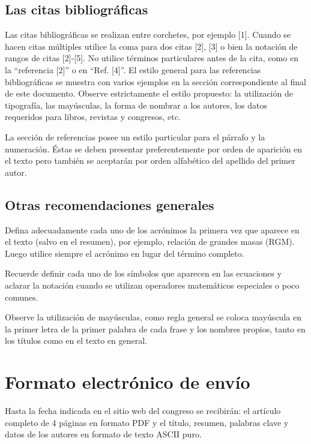 \documentclass[conference,a4paper,10pt,oneside,final]{tfmpd}
\begin{document}
\subsection{Las citas bibliográficas}

Las citas bibliográficas se realizan entre corchetes, por ejemplo [1]. Cuando se hacen citas múltiples utilice la coma para dos citas [2], [3] o bien la notación de rangos de citas [2]-[5]. No utilice términos particulares antes de la cita, como en la ``referencia [2]'' o en ``Ref. [4]''. El estilo general para las referencias bibliográficas se muestra con varios ejemplos en la sección correspondiente al final de este documento. Observe estrictamente el estilo propuesto: la utilización de tipografía, las mayúsculas, la forma de nombrar a los autores, los datos requeridos para libros, revistas y congresos, etc.

La sección de referencias posee un estilo particular para el párrafo y la numeración. Éstas se deben presentar preferentemente por orden de aparición en el texto pero también se aceptarán por orden alfabético del apellido del primer autor.

\subsection{Otras recomendaciones generales}

Defina adecuadamente cada uno de los acrónimos la primera vez que aparece en el texto (salvo en el resumen), por ejemplo, relación de grandes masas (RGM). Luego utilice siempre el acrónimo en lugar del término completo.

Recuerde definir cada uno de los símbolos que aparecen en las ecuaciones y aclarar la notación cuando se utilizan operadores matemáticos especiales o poco comunes.

Observe la utilización de mayúsculas, como regla general se coloca mayúscula en la primer letra de la primer palabra de cada frase y los nombres propios, tanto en los títulos como en el texto en general.

\section{Formato electrónico de envío}

Hasta la fecha indicada en el sitio web del congreso se recibirán: el artículo completo de 4 páginas en formato PDF y el título, resumen, palabras clave y datos de los autores en formato de texto ASCII puro.
\end{document}
